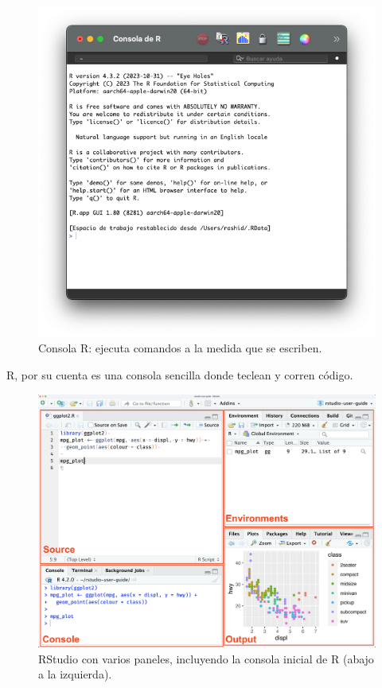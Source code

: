 \documentclass[
]{article}
\begin{document}
\begin{figure}
\centering
\includegraphics{R.png}
\caption{Consola R: ejecuta comandos a la medida que se escriben.}
\end{figure}

R, por su cuenta es una consola sencilla donde teclean y corren código.

\begin{figure}
\centering
\includegraphics{RStudioPanes.jpeg}
\caption{RStudio con varios paneles, incluyendo la consola inicial de R
(abajo a la izquierda).}
\end{figure}
\end{document}
